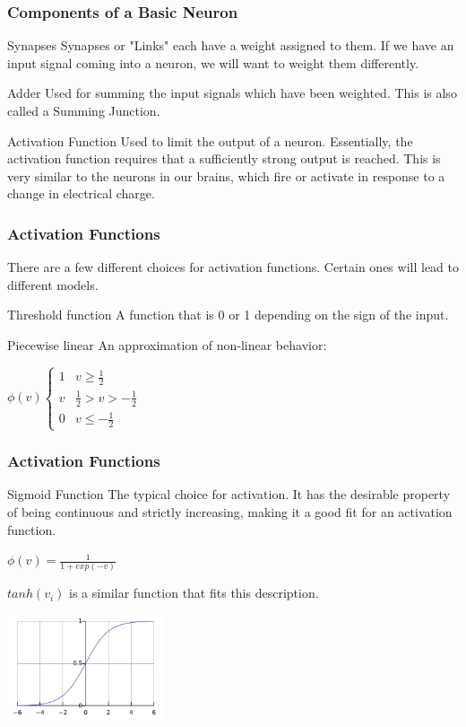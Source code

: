 \documentclass{beamer}
\begin{document}
\begin{frame}
\frametitle{Components of a Basic Neuron}
\begin{block}{Synapses}
Synapses or "Links"  each have a weight assigned to them. If we have an input signal coming into a neuron, we will want to weight them differently.
\end{block}
\begin{block}{Adder}
Used for summing the input signals which have been weighted. This is also called a Summing Junction.
\end{block}

\begin{block}{Activation Function}
Used to limit the output of a neuron. Essentially, the activation function  requires that a sufficiently strong output is reached. This is very similar to the neurons in our brains, which fire or activate in response to a change in electrical charge.
\end{block}

\end{frame}

\begin{frame}
\frametitle{Activation Functions}
There are a few different choices for activation functions. Certain ones will lead to different models. 
\begin{block}{Threshold function}
A function that is 0 or 1 depending on the sign of the input. 
\end{block}
\begin{block}{Piecewise linear}
An approximation of non-linear behavior:


$
   \phi(v) \left\{
     \begin{array}{ll}
       1 &  v \geq \frac{1}{2}\\
       v & \frac{1}{2}>v>-\frac{1}{2}\\
       0 &  v \leq -\frac{1}{2}\
     \end{array}
   \right.
$
\end{block}
\end{frame}


\begin{frame}
\frametitle{Activation Functions}
\begin{block}{Sigmoid Function}
The typical choice for activation. It has the desirable property of being continuous and strictly increasing, making it a good fit for an activation function. 


$\phi(v) = \frac{1}{1+exp(-v)}$

$tanh(v_i)$ 
is a similar function that fits this description.
\end{block}
\includegraphics[width = 175px]{sig.png}
\end{frame}
\end{document}
